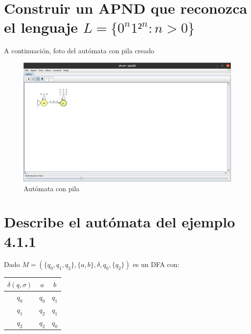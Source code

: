 \documentclass[11pt]{article}
\begin{document}
\section{Construir un APND que reconozca el lenguaje $L=\{0^n1²^n : n > 0\}$ }
A continuación, foto del autómata con pila creado
\begin{figure}[htb]
	\centering
	\includegraphics[width=1.25\textwidth]{4.png}
	\caption{Autómata con pila}
\end{figure}

\section{Describe el autómata del ejemplo 4.1.1}

Dado $M=(\{q_0,q_1,q_2\}, \{a,b\}, \delta, q_0, \{q_2\})$ es un DFA con:\\

\begin{table}[h!]
\begin{tabular}{c|c|c}
  $\delta(q,\sigma)$ & $a$ & $b$\\
  \hline
  $q_0$& $q_0$ & $q_1$\\
  \hline
  $q_1$& $q_2$ & $q_1$\\
  \hline
  $q_2$& $q_2$ & $q_0$
\end{tabular}
\end{table}
\end{document}
